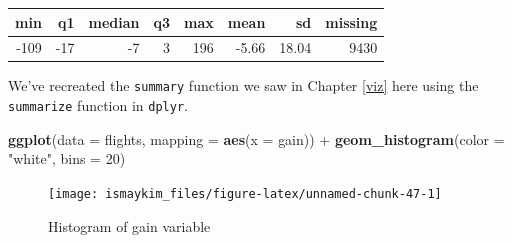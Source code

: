 \documentclass[]{tufte-book}
\newenvironment{Shaded}{\begin{snugshade}}{\end{snugshade}}
\newcommand{\KeywordTok}[1]{\textcolor[rgb]{0.13,0.29,0.53}{\textbf{{#1}}}}
\newcommand{\DataTypeTok}[1]{\textcolor[rgb]{0.13,0.29,0.53}{{#1}}}
\newcommand{\DecValTok}[1]{\textcolor[rgb]{0.00,0.00,0.81}{{#1}}}
\newcommand{\FloatTok}[1]{\textcolor[rgb]{0.00,0.00,0.81}{{#1}}}
\newcommand{\StringTok}[1]{\textcolor[rgb]{0.31,0.60,0.02}{{#1}}}
\newcommand{\OtherTok}[1]{\textcolor[rgb]{0.56,0.35,0.01}{{#1}}}
\newcommand{\NormalTok}[1]{{#1}}
\theoremstyle{definition}
\theoremstyle{definition}
\theoremstyle{remark}
\begin{document}
\begin{Shaded}
\end{Shaded}

\begin{tabular}{r|r|r|r|r|r|r|r}
\hline
min & q1 & median & q3 & max & mean & sd & missing\\
\hline
-109 & -17 & -7 & 3 & 196 & -5.66 & 18.04 & 9430\\
\hline
\end{tabular}

We've recreated the \texttt{summary} function we saw in Chapter
\ref{viz} here using the \texttt{summarize} function in \texttt{dplyr}.

\begin{Shaded}
\begin{Highlighting}[]
\KeywordTok{ggplot}\NormalTok{(}\DataTypeTok{data =} \NormalTok{flights, }\DataTypeTok{mapping =} \KeywordTok{aes}\NormalTok{(}\DataTypeTok{x =} \NormalTok{gain)) +}
\StringTok{  }\KeywordTok{geom_histogram}\NormalTok{(}\DataTypeTok{color =} \StringTok{"white"}\NormalTok{, }\DataTypeTok{bins =} \DecValTok{20}\NormalTok{)}
\end{Highlighting}
\end{Shaded}

\begin{figure}

{\centering \texttt{[image: ismaykim\_files/figure-latex/unnamed-chunk-47-1]} 

}

\caption[Histogram of gain variable]{Histogram of gain variable}\label{fig:unnamed-chunk-47}
\end{figure}
\end{document}
